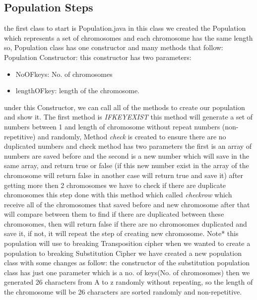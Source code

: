 \subsection{Population Steps}
the first class to start is Population.java in this class we created the Population which represents a set of chromosomes and each chromosome has the same length so, Population class has one constructor and many methods that follow:
\textsf{Population Constructor:} this constructor has two parameters:
\begin{itemize}
    \item{\textsf{NoOFkeys:} No. of chromosomes}
    \item{\textsf{lengthOFkey:} length of the chromosome.}
\end{itemize} 
under this Constructor, we can call all of the methods to create our population and show it. The first method is \textit{IFKEYEXIST} this method will generate a set of numbers between 1 and length of chromosome without repeat numbers (non-repetitive) and randomly, Method \textit{check} is created to ensure there are no duplicated numbers and check method has two parameters the first is an array of numbers are saved before and the second is a new number which will save in the same array,
and return true or false (if this new number exist in the array of the chromosome will return false in another case will return true and save it) after getting more then 2 chromosomes we have to check if there are duplicate chromosomes this step done with this method which called \textit{checkrow} which receive all of the chromosomes that saved before and new chromosome after that will compare between them to find if there are duplicated between these chromosomes, then will return false if there are no chromosomes duplicated and save it, if not, it will repeat the step of creating new chromosome.
\textsf{Note*}
this population will use to breaking Transposition cipher when we wanted to create a population to breaking Substitution Cipher we have created a new population class with some changes as follow:
the constructor of the substitution population class has just one parameter which is a no. of keys(No. of chromosomes) then we generated 26 characters from A to z randomly without repeating, so the length of the chromosome will be 26 characters are sorted randomly and non-repetitive.


